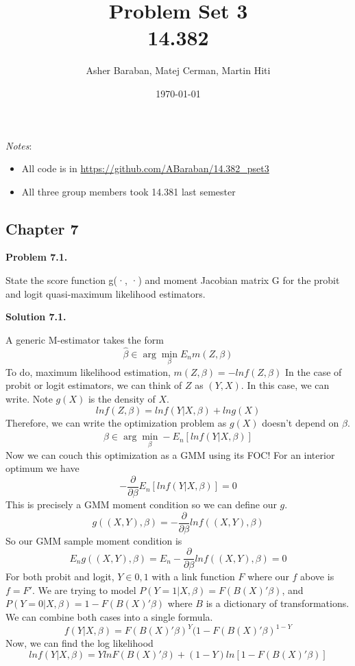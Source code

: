 \documentclass[11pt]{article}
\title{Problem Set 3 \\ 14.382}
\author{Asher Baraban, Matej Cerman, Martin Hiti}
\date{\today}
\newenvironment{problem}[1]
    {\bigskip\noindent\textbf{Problem #1.}\par\setlength{\parindent}{0pt}}
    {\medskip}
\newenvironment{solution}[1]
    {\bigskip\noindent\textbf{Solution #1.} \par}
    {\medskip}
\begin{document}
\maketitle

\noindent \textit{Notes}:
\begin{itemize}
    \item All code is in \url{https://github.com/ABaraban/14.382_pset3}
    \item All three group members took 14.381 last semester
\end{itemize}

\subsection*{Chapter 7} 

\begin{problem}{7.1}
State the score function g(·, ·) and moment Jacobian matrix
G for the probit and logit quasi-maximum likelihood estimators.
\end{problem}

\begin{solution}{7.1}
A generic M-estimator takes the form 
\[\hat{\beta} \in \arg\min_{\beta}E_nm(Z,\beta)\]
\end{solution} 
To do, maximum likelihood estimation, $m(Z,\beta) = -lnf(Z,\beta)$
In the case of probit or logit estimators, we can think of $Z$ as $(Y,X)$. In this case, we can write. Note $g(X)$ is the density of $X$.
\[lnf(Z,\beta) = lnf(Y|X, \beta) + lng(X)\]
Therefore, we can write the optimization problem as $g(X)$ doesn't depend on $\beta$. 
\[\hat{\beta} \in \arg\min_{\beta}-E_n\left[lnf(Y|X,\beta)\right]\]
Now we can couch this optimization as a GMM using its FOC! For an interior optimum we have 
\[-\frac{\partial}{\partial \beta}E_n\left[lnf(Y|X,\beta)\right] = 0\]
This is precisely a GMM moment condition so we can define our $g$.
\[g((X,Y), \beta) =-\frac{\partial }{\partial \beta}lnf((X,Y), \beta)\]
So our GMM sample moment condition is 
\[E_ng((X,Y), \beta) =E_n-\frac{\partial }{\partial \beta}lnf((X,Y), \beta) = 0\]
For both probit and logit, $Y \in {0,1}$ with a link function $F$ where our $f$ above is $f=F'$. We are trying to model $P(Y=1|X,\beta) = F(B(X)'\beta)$, and $P(Y=0|X,\beta) =1- F(B(X)'\beta)$ where $B$ is a dictionary of transformations. We can combine both cases into a single formula.
\[f(Y|X,\beta) = F(B(X)'\beta)^Y(1-F(B(X)'\beta)^{1-Y}\]
Now, we can find the log likelihood
\[lnf(Y|X,\beta) = YlnF(B(X)'\beta) + (1-Y)ln\left[1-F(B(X)'\beta)\right]\]
\end{document}
